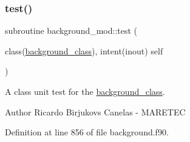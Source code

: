 \subsubsection{\texorpdfstring{test()}{test()}}
{\footnotesize\ttfamily subroutine background\+\_\+mod\+::test (\begin{DoxyParamCaption}\item[{class(\mbox{\hyperlink{structbackground__mod_1_1background__class}{background\+\_\+class}}), intent(inout)}]{self }\end{DoxyParamCaption})\hspace{0.3cm}{\ttfamily [private]}}



A class \textquotesingle{}unit\textquotesingle{} test for the \mbox{\hyperlink{structbackground__mod_1_1background__class}{background\+\_\+class}}. 

\begin{DoxyAuthor}{Author}
Ricardo Birjukovs Canelas -\/ M\+A\+R\+E\+T\+EC 
\end{DoxyAuthor}


Definition at line 856 of file background.\+f90.


